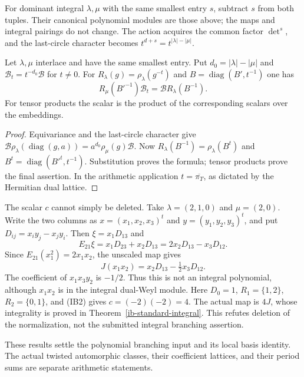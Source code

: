 For dominant integral $\lambda,\mu$ with the same
smallest entry $s$, subtract $s$ from both tuples.
Their canonical polynomial modules are those above;
the maps and integral pairings do not change.
The action acquires the common factor $\det^s$,
and the last-circle character becomes
$t^{d+s}=t^{|\lambda|-|\mu|}$.

\begin{corollary}\label{ib-diagonal-covariance}
Let $\lambda,\mu$ interlace and have the same smallest
entry.  Put $d_0=|\lambda|-|\mu|$ and
$\mathcal B_t=t^{-d_0}\mathcal B$ for $t\ne0$.
For $R_\lambda(g)=\rho_\lambda(g^{-t})$ and
$B=\operatorname{diag}(B',t^{-1})$ one has
\[
                R_\mu(B'^{-1})\mathcal B_t
                              =\mathcal B R_\lambda(B^{-1}).
 \tag{IB13}
\]
For tensor products the scalar is the product of
the corresponding scalars over the embeddings.
\end{corollary}
\begin{proof}
Equivariance and the last-circle character give
$\mathcal B\rho_\lambda(\operatorname{diag}(g,a))
=a^{d_0}\rho_\mu(g)\mathcal B$.
Now $R_\lambda(B^{-1})=\rho_\lambda(B^t)$ and
$B^t=\operatorname{diag}(B'^t,t^{-1})$.
Substitution proves the formula; tensor products
prove the final assertion.
In the arithmetic application $t=\overline{\pi_T}$,
as dictated by the Hermitian dual lattice.
\end{proof}

The scalar $c$ cannot simply be deleted.
Take $\lambda=(2,1,0)$ and $\mu=(2,0)$.
Write the two columns as $x=(x_1,x_2,x_3)^t$ and
$y=(y_1,y_2,y_3)^t$, and put $D_{ij}=x_i y_j-x_j y_i$.
Then $\xi=x_1D_{13}$ and
\[
 E_{21}\xi=x_1D_{23}+x_2D_{13}
                         =2x_2D_{13}-x_3D_{12}.
\]
Since $E_{21}(x_1^2)=2x_1x_2$, the unscaled map gives
\[
                  J(x_1x_2)=x_2D_{13}-\tfrac12x_3D_{12}.
\]
The coefficient of $x_1x_3y_2$ is $-1/2$.
Thus this is not an integral polynomial, although
$x_1x_2$ is in the integral dual-Weyl module.
Here $D_0=1$, $R_1=\{1,2\}$, $R_2=\{0,1\}$, and
(IB2) gives $c=(-2)(-2)=4$.
The actual map is $4J$, whose integrality is proved
in Theorem~\ref{ib-standard-integral}.
This refutes deletion of the normalization, not
the submitted integral branching assertion.

These results settle the polynomial branching input
and its local basis identity.  The actual twisted
automorphic classes, their coefficient lattices,
and their period sums are separate arithmetic statements.



